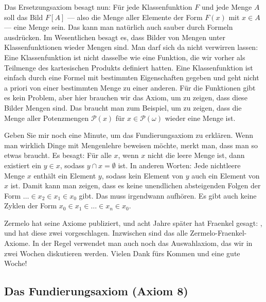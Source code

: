 \begin{spoken-clean}[01:21:39 - 01:24:03]
Das Ersetzungsaxiom besagt nun: Für jede Klassenfunktion $F$ und jede Menge $A$ soll das Bild $F[A]$ --- also die Menge aller Elemente der Form $F(x)$ mit $x \in A$ --- eine Menge sein. Das kann man natürlich auch sauber durch Formeln ausdrücken. Im Wesentlichen besagt es, dass Bilder von Mengen unter Klassenfunktionen wieder Mengen sind. Man darf sich da nicht verwirren lassen: Eine Klassenfunktion ist nicht dasselbe wie eine Funktion, die wir vorher als Teilmenge des kartesischen Produkts definiert hatten. Eine Klassenfunktion ist einfach durch eine Formel mit bestimmten Eigenschaften gegeben und geht nicht a priori von einer bestimmten Menge zu einer anderen. Für die  Funktionen gibt es kein Problem, aber hier brauchen wir das Axiom, um zu zeigen, dass diese Bilder Mengen sind. Das braucht man zum Beispiel, um zu zeigen, dass die Menge aller Potenzmengen $\mathcal{P}(x)$ für $x \in \mathcal{P}(\omega)$ wieder eine Menge ist.

Geben Sie mir noch eine Minute, um das Fundierungsaxiom zu erklären. Wenn man wirklich Dinge mit Mengenlehre beweisen möchte, merkt man, dass man so etwas braucht. Es besagt: Für alle $x$, wenn $x$ nicht die leere Menge ist, dann existiert ein $y \in x$, sodass $y \cap x = \emptyset$ ist. In anderen Worten: Jede nichtleere Menge $x$ enthält ein Element $y$, sodass kein Element von $y$ auch ein Element von $x$ ist. Damit kann man zeigen, dass es keine unendlichen absteigenden Folgen der Form $\dots \in x_2 \in x_1 \in x_0$ gibt. Das muss irgendwann aufhören. Es gibt auch keine Zyklen der Form $x_0 \in x_1 \in \dots \in x_n \in x_0$.

Zermelo hat seine Axiome publiziert, und acht Jahre später hat Fraenkel gesagt: , und hat diese zwei vorgeschlagen. Inzwischen sind das alle Zermelo-Fraenkel-Axiome. In der Regel verwendet man auch noch das Auswahlaxiom, das wir in zwei Wochen diskutieren werden. Vielen Dank fürs Kommen und eine gute Woche!
\end{spoken-clean}

\subsection{Das Fundierungsaxiom (Axiom 8)}


